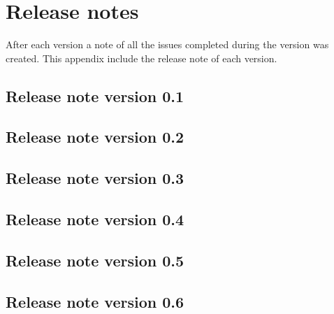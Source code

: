 \chapter{Release notes}
\label{app:release-notes}
After each version a note of all the issues completed during the version was created. This appendix include the release note of each version.

\newpage
\section{Release note version 0.1}
\label{app:release-note-1}
% 
% 


\newpage
\section{Release note version 0.2}
\label{app:release-note-2}


\newpage
\section{Release note version 0.3}
\label{app:release-note-3}


\newpage
\section{Release note version 0.4}
\label{app:release-note-4}


\newpage
\section{Release note version 0.5}
\label{app:release-note-5}


\newpage
\section{Release note version 0.6}
\label{app:release-note-6}


